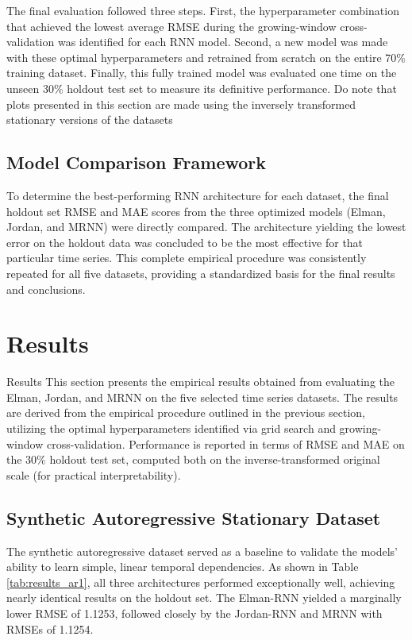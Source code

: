 \documentclass[conference, 10pt]{IEEEtran}
\begin{document}
The final evaluation followed three steps. First, the hyperparameter combination that achieved the lowest average RMSE
during the growing-window cross-validation was identified for each RNN model. Second, a new model was made with these
optimal hyperparameters and retrained from scratch on the entire 70\% training dataset. Finally, this fully trained
model was evaluated one time on the unseen 30\% holdout test set to measure its definitive performance. Do note that
plots presented in this section are made using the inversely transformed stationary versions of the datasets

\subsection{Model Comparison Framework}
To determine the best-performing RNN architecture for each dataset, the final holdout set RMSE and MAE scores from the
three optimized models (Elman, Jordan, and MRNN) were directly compared. The architecture yielding the lowest error
on the holdout data was concluded to be the most effective for that particular time series. This complete empirical
procedure was consistently repeated for all five datasets, providing a standardized basis for the final results and
conclusions.

\section{Results}
Results This section presents the empirical results obtained from evaluating the Elman, Jordan, and MRNN on the five
selected time series datasets. The results are derived from the empirical procedure outlined in the previous section,
utilizing the optimal hyperparameters identified via grid search and growing-window cross-validation. Performance is
reported in terms of RMSE and MAE on the 30\% holdout test set, computed both on the inverse-transformed original scale
(for practical interpretability).

\subsection{Synthetic Autoregressive Stationary Dataset}

The synthetic autoregressive dataset served as a baseline to validate the models' ability to learn simple, linear temporal
dependencies. As shown in Table \ref{tab:results_ar1}, all three architectures performed exceptionally well, achieving
nearly identical results on the holdout set. The Elman-RNN yielded a marginally lower RMSE of 1.1253, followed closely
by the Jordan-RNN and MRNN with RMSEs of 1.1254.
\end{document}
